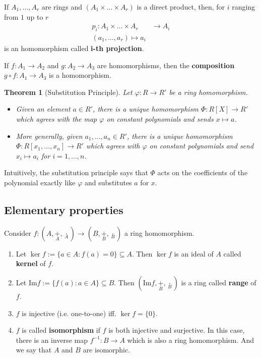 \documentclass[12pt,a4paper]{article}
\newtheorem{theorem}{Theorem}[section]
\theoremstyle{definition}
\begin{document}
If $A_1, \ldots, A_r$ are rings and $(A_1 \times \ldots \times A_r)$ is a direct product, then, for $i$ ranging from $1$ up to $r$
\begin{equation*}
\begin{aligned}
p_i : A_1 \times \ldots \times A_r & \to A_i \\
(a_1, \ldots, a_r) \mapsto a_i
\end{aligned}
\end{equation*}
is an homomorphism called \textbf{i-th projection}.

If $f:A_1 \to A_2$ and $g:A_2 \to A_3$ are homomorphisms, then the \textbf{composition} $g \circ f : A_1 \to A_3$ is a homomorphism.

\begin{theorem}[Substitution Principle]
Let $\varphi : R \to R'$ be a ring homomorphism. 
\begin{itemize}
\item Given an element $a \in R'$, there is a unique homomorphism $\Phi : R[X] \to R'$ which agrees with the map $\varphi$ on constant polynomials and sends $x \mapsto a$.
\item More generally, given $a_1, \ldots, a_n \in R'$, there is a unique homomorphism $\Phi : R[x_1,\ldots,x_n] \to R'$ which agrees with $\varphi$ on constant polynomials and send $x_i \mapsto a_i$ for $i=1,\ldots,n$.
\end{itemize}
\end{theorem}

Intuitively, the substitution principle says that $\Phi$ acts on the coefficients of the polynomial exactly like $\varphi$ and substitutes $a$ for $x$.

\subsection{Elementary properties}

Consider $f: (A, \underset{A}{+}, \underset{A}{\cdot}) \longrightarrow (B, \underset{B}{+}, \underset{B}{\cdot})$ a ring homomorphism. 
\begin{enumerate}
\item Let $\ker f := \{ a \in A : f(a) = 0 \} \subseteq A$. Then $\ker f$ is an ideal of $A$ called \textbf{kernel} of $f$.
\item Let $\text{Im} f := \{ f(a) : a \in A \} \subseteq B$. Then $(\text{Im} f, \underset{B}{+}, \underset{B}{\cdot})$ is a ring called \textbf{range} of $f$.
\item $f$ is injective (i.e. one-to-one) iff. $\ker f = \{ 0 \}$.
\item $f$ is called \textbf{isomorphism} if $f$ is both injective and surjective. In this case, there is an inverse map $f^{-1} : B \to A$ which is also a ring homomorphism. And we say that $A$ and $B$ are isomorphic.
\end{enumerate}
\end{document}
